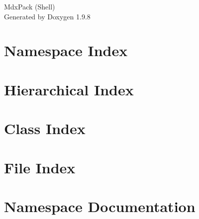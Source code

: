 \documentclass[twoside]{book}
\newcommand{\+}{\discretionary{\mbox{\scriptsize$\hookleftarrow$}}{}{}}
\newcommand{\clearemptydoublepage}{%
    \newpage{\pagestyle{empty}\cleardoublepage}%
  }
\begin{document}
  \raggedbottom
    \hypersetup{pageanchor=false,
                bookmarksnumbered=true,
                pdfencoding=unicode
               }
  \begin{titlepage}
  \vspace*{7cm}
  \begin{center}%
  {\Large Mdx\+Pack (\+Shell)}\\
  \vspace*{1cm}
  {\large Generated by Doxygen 1.9.8}\\
  \end{center}
  \end{titlepage}
  \clearemptydoublepage
  \tableofcontents
  \clearemptydoublepage
  \hypersetup{pageanchor=true}
\chapter{Namespace Index}

\chapter{Hierarchical Index}

\chapter{Class Index}

\chapter{File Index}

\chapter{Namespace Documentation}







\end{document}
